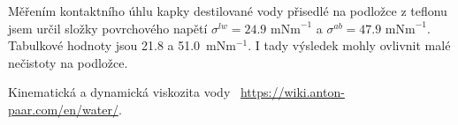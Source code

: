 \documentclass[a4paper,11pt]{article}
\begin{document}
Měřením kontaktního úhlu kapky destilované vody přisedlé na podložce z teflonu jsem určil složky povrchového napětí $\sigma^{lw} = 24.9 \text{ mNm}^{-1}$ a $\sigma^{ab} = 47.9 \text{ mNm}^{-1}$. Tabulkové hodnoty jsou 21.8 a 51.0~mNm$^{-1}$. I tady výsledek mohly ovlivnit malé nečistoty na podložce.


\begin{thebibliography}{0}
 Kinematická a dynamická viskozita vody ~\url{https://wiki.anton-paar.com/en/water/}.   
\end{thebibliography}
\end{document}
